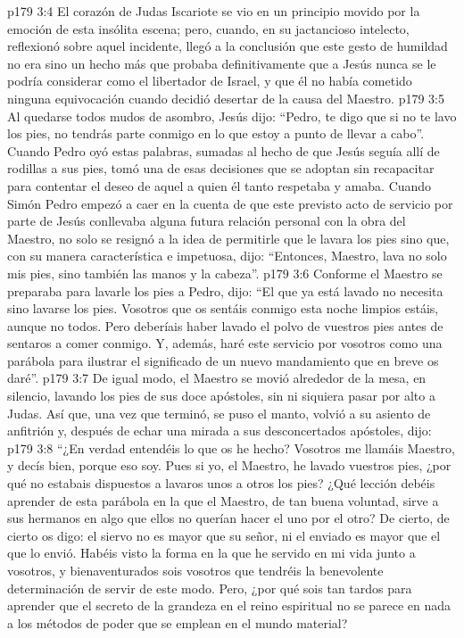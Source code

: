\vs p179 3:4 El corazón de Judas Iscariote se vio en un principio movido por la emoción de esta insólita escena; pero, cuando, en su jactancioso intelecto, reflexionó sobre aquel incidente, llegó a la conclusión que este gesto de humildad no era sino un hecho más que probaba definitivamente que a Jesús nunca se le podría considerar como el libertador de Israel, y que él no había cometido ninguna equivocación cuando decidió desertar de la causa del Maestro.
\vs p179 3:5 Al quedarse todos mudos de asombro, Jesús dijo: “Pedro, te digo que si no te lavo los pies, no tendrás parte conmigo en lo que estoy a punto de llevar a cabo”. Cuando Pedro oyó estas palabras, sumadas al hecho de que Jesús seguía allí de rodillas a sus pies, tomó una de esas decisiones que se adoptan sin recapacitar para contentar el deseo de aquel a quien él tanto respetaba y amaba. Cuando Simón Pedro empezó a caer en la cuenta de que este previsto acto de servicio por parte de Jesús conllevaba alguna futura relación personal con la obra del Maestro, no solo se resignó a la idea de permitirle que le lavara los pies sino que, con su manera característica e impetuosa, dijo: “Entonces, Maestro, lava no solo mis pies, sino también las manos y la cabeza”.
\vs p179 3:6 Conforme el Maestro se preparaba para lavarle los pies a Pedro, dijo: “El que ya está lavado no necesita sino lavarse los pies. Vosotros que os sentáis conmigo esta noche limpios estáis, aunque no todos. Pero deberíais haber lavado el polvo de vuestros pies antes de sentaros a comer conmigo. Y, además, haré este servicio por vosotros como una parábola para ilustrar el significado de un nuevo mandamiento que en breve os daré”.
\vs p179 3:7 De igual modo, el Maestro se movió alrededor de la mesa, en silencio, lavando los pies de sus doce apóstoles, sin ni siquiera pasar por alto a Judas. Así que, una vez que terminó, se puso el manto, volvió a su asiento de anfitrión y, después de echar una mirada a sus desconcertados apóstoles, dijo:
\vs p179 3:8 \pc “¿En verdad entendéis lo que os he hecho? Vosotros me llamáis Maestro, y decís bien, porque eso soy. Pues si yo, el Maestro, he lavado vuestros pies, ¿por qué no estabais dispuestos a lavaros unos a otros los pies? ¿Qué lección debéis aprender de esta parábola en la que el Maestro, de tan buena voluntad, sirve a sus hermanos en algo que ellos no querían hacer el uno por el otro? De cierto, de cierto os digo: el siervo no es mayor que su señor, ni el enviado es mayor que el que lo envió. Habéis visto la forma en la que he servido en mi vida junto a vosotros, y bienaventurados sois vosotros que tendréis la benevolente determinación de servir de este modo. Pero, ¿por qué sois tan tardos para aprender que el secreto de la grandeza en el reino espiritual no se parece en nada a los métodos de poder que se emplean en el mundo material?
